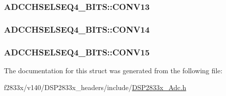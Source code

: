 \subsubsection[{C\+O\+N\+V13}]{ A\+D\+C\+C\+H\+S\+E\+L\+S\+E\+Q4\+\_\+\+B\+I\+T\+S\+::\+C\+O\+N\+V13}\label{struct_a_d_c_c_h_s_e_l_s_e_q4___b_i_t_s_afedeed7769b05e5d78d9041d2e142af8}
\hypertarget{struct_a_d_c_c_h_s_e_l_s_e_q4___b_i_t_s_a5bda8686af6fa5b3828ef26a5581c799}{}
\subsubsection[{C\+O\+N\+V14}]{ A\+D\+C\+C\+H\+S\+E\+L\+S\+E\+Q4\+\_\+\+B\+I\+T\+S\+::\+C\+O\+N\+V14}\label{struct_a_d_c_c_h_s_e_l_s_e_q4___b_i_t_s_a5bda8686af6fa5b3828ef26a5581c799}
\hypertarget{struct_a_d_c_c_h_s_e_l_s_e_q4___b_i_t_s_af9b7662effab51406dd650aecc7257d7}{}
\subsubsection[{C\+O\+N\+V15}]{ A\+D\+C\+C\+H\+S\+E\+L\+S\+E\+Q4\+\_\+\+B\+I\+T\+S\+::\+C\+O\+N\+V15}\label{struct_a_d_c_c_h_s_e_l_s_e_q4___b_i_t_s_af9b7662effab51406dd650aecc7257d7}


The documentation for this struct was generated from the following file\+:\begin{DoxyCompactItemize}
\item 
f2833x/v140/\+D\+S\+P2833x\+\_\+headers/include/\hyperlink{_d_s_p2833x___adc_8h}{D\+S\+P2833x\+\_\+\+Adc.\+h}\end{DoxyCompactItemize}
